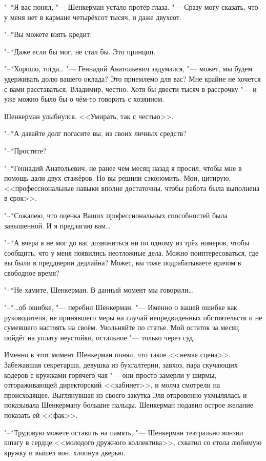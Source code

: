"--*Я вас понял, "--- Шенкерман устало протёр глаза.
"--- Сразу могу сказать, что у меня нет в кармане четырёхсот тысяч, и даже двухсот.

"--*Вы можете взять кредит.

"--*Даже если бы мог, не стал бы.
Это принцип.

"--*Хорошо, тогда\ldots{} "--- Геннадий Анатольевич задумался, "--- может, мы будем удерживать долю вашего оклада?
Это приемлемо для вас?
Мне крайне не хочется с вами расставаться, Владимир, честно.
Хотя бы двести тысяч в рассрочку "--- и уже можно было бы о чём-то говорить с хозяином.

Шенкерман улыбнулся.
<<Умирать, так с честью>>.

"--*А давайте долг погасите вы, из своих личных средств?

"--*Простите?

"--*Геннадий Анатольевич, не ранее чем месяц назад я просил, чтобы мне в помощь дали двух стажёров.
Но вы решили сэкономить.
Мои, цитирую, <<профессиональные навыки вполне достаточны, чтобы работа была выполнена в срок>>.

"--*Сожалею, что оценка Ваших профессиональных способностей была завышенной.
И я предлагаю вам\ldots{}

"--*А вчера я не мог до вас дозвониться ни по одному из трёх номеров, чтобы сообщить, что у меня появились неотложные дела.
Можно поинтересоваться, где вы были в преддверии дедлайна?
Может, вы тоже подрабатываете врачом в свободное время?

"--*Не хамите, Шенкерман.
В данный момент мы говорили\ldots{}

"--*\ldots{}об ошибке, "--- перебил Шенкерман.
"--- Именно о вашей ошибке как руководителя, не принявшего меры на случай непредвиденных обстоятельств и не сумевшего настоять на своём.
Увольняйте по статье.
Мой остаток за месяц пойдёт на уплату неустойки, остальное "--- только через суд.

Именно в этот момент Шенкерман понял, что такое <<немая сцена>>.
Забежавшая секретарша, девушка из бухгалтерии, завхоз, пара скучающих кодеров с кружками горячего чая "--- они просто замерли у ширмы, отгораживающей директорский <<кабинет>>, и молча смотрели на происходящее.
Выглянувшая из своего закутка Эля откровенно ухмылялась и показывала Шенкерману большие пальцы.
Шенкерман подавил острое желание показать ей <<фак>>.

"--*Трудовую можете оставить на память, "--- Шенкерман театрально вонзил шпагу в сердце <<молодого дружного коллектива>>, схватил со стола любимую кружку и вышел вон, хлопнув дверью.

